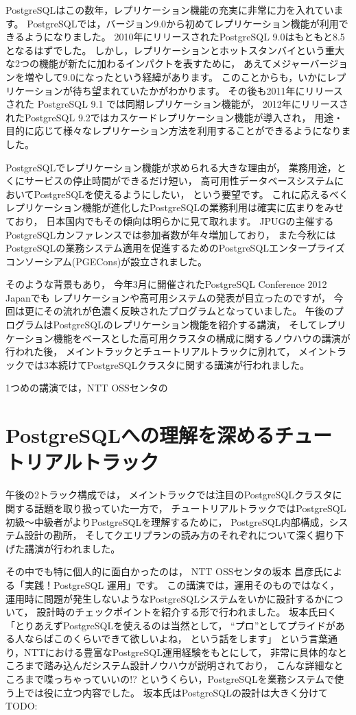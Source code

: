 PostgreSQLはこの数年，レプリケーション機能の充実に非常に力を入れています。
PostgreSQLでは，バージョン9.0から初めてレプリケーション機能が利用できるようになりました。
2010年にリリースされたPostgreSQL 9.0はもともと8.5となるはずでした。
しかし，レプリケーションとホットスタンバイという重大な2つの機能が新たに加わるインパクトを表すために，
あえてメジャーバージョンを増やして9.0になったという経緯があります。
このことからも，いかにレプリケーションが待ち望まれていたかがわかります。
その後も2011年にリリースされた PostgreSQL 9.1 では同期レプリケーション機能が，
2012年にリリースされたPostgreSQL 9.2ではカスケードレプリケーション機能が導入され，
用途・目的に応じて様々なレプリケーション方法を利用することができるようになりました。

PostgreSQLでレプリケーション機能が求められる大きな理由が，
業務用途，とくにサービスの停止時間ができるだけ短い，
高可用性データベースシステムにおいてPostgreSQLを使えるようにしたい，
という要望です。
これに応えるべくレプリケーション機能が進化したPostgreSQLの業務利用は確実に広まりをみせており，
日本国内でもその傾向は明らかに見て取れます。
JPUGの主催するPostgreSQLカンファレンスでは参加者数が年々増加しており，
また今秋にはPostgreSQLの業務システム適用を促進するためのPostgreSQLエンタープライズコンソーシアム(PGECons)が設立されました。

そのような背景もあり，
今年3月に開催されたPostgreSQL Conference 2012 Japanでも
レプリケーションや高可用システムの発表が目立ったのですが，
今回は更にその流れが色濃く反映されたプログラムとなっていました。
午後のプログラムはPostgreSQLのレプリケーション機能を紹介する講演，
そしてレプリケーション機能をベースとした高可用クラスタの構成に関するノウハウの講演が行われた後，
メイントラックとチュートリアルトラックに別れて，
メイントラックでは3本続けてPostgreSQLクラスタに関する講演が行われました。

1つめの講演では，NTT OSSセンタの

\section{PostgreSQLへの理解を深めるチュートリアルトラック}

午後の2トラック構成では，
メイントラックでは注目のPostgreSQLクラスタに関する話題を取り扱っていた一方で，
チュートリアルトラックではPostgreSQL初級〜中級者がよりPostgreSQLを理解するために，
PostgreSQL内部構成，システム設計の勘所，
そしてクエリプランの読み方のそれぞれについて深く掘り下げた講演が行われました。

その中でも特に個人的に面白かったのは，
NTT OSSセンタの坂本 昌彦氏による「実践！PostgreSQL 運用」です。
この講演では，運用そのものではなく，
運用時に問題が発生しないようなPostgreSQLシステムをいかに設計するかについて，
設計時のチェックポイントを紹介する形で行われました。
坂本氏曰く「とりあえずPostgreSQLを使えるのは当然として，
``プロ''としてプライドがある人ならばこのくらいできて欲しいよね，
という話をします」
という言葉通り，NTTにおける豊富なPostgreSQL運用経験をもとにして，
非常に具体的なところまで踏み込んだシステム設計ノウハウが説明されており，
こんな詳細なところまで喋っちゃっていいの!?
というくらい，PostgreSQLを業務システムで使う上では役に立つ内容でした。
坂本氏はPostgreSQLの設計は大きく分けて TODO:


